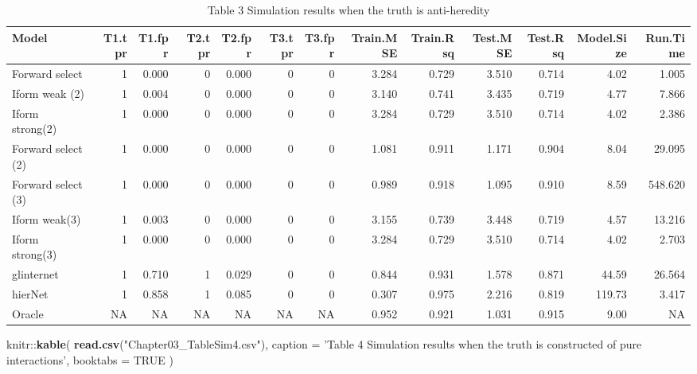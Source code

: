 \documentclass[11pt,]{book}
\newenvironment{Shaded}{\begin{snugshade}}{\end{snugshade}}
\newcommand{\KeywordTok}[1]{\textcolor[rgb]{0.13,0.29,0.53}{\textbf{{#1}}}}
\newcommand{\DataTypeTok}[1]{\textcolor[rgb]{0.13,0.29,0.53}{{#1}}}
\newcommand{\StringTok}[1]{\textcolor[rgb]{0.31,0.60,0.02}{{#1}}}
\newcommand{\OtherTok}[1]{\textcolor[rgb]{0.56,0.35,0.01}{{#1}}}
\newcommand{\NormalTok}[1]{{#1}}
\theoremstyle{definition}
\theoremstyle{definition}
\theoremstyle{remark}
\begin{document}
\begin{table}

\caption{\label{tab:Chap3sim3}Table 3 Simulation results when the truth is anti-heredity}
\centering
\begin{tabular}[t]{lrrrrrrrrrrrr}
\toprule
Model & T1.tpr & T1.fpr & T2.tpr & T2.fpr & T3.tpr & T3.fpr & Train.MSE & Train.Rsq & Test.MSE & Test.Rsq & Model.Size & Run.Time\\
\midrule
Forward select & 1 & 0.000 & 0 & 0.000 & 0 & 0 & 3.284 & 0.729 & 3.510 & 0.714 & 4.02 & 1.005\\
Iform weak (2) & 1 & 0.004 & 0 & 0.000 & 0 & 0 & 3.140 & 0.741 & 3.435 & 0.719 & 4.77 & 7.866\\
Iform strong(2) & 1 & 0.000 & 0 & 0.000 & 0 & 0 & 3.284 & 0.729 & 3.510 & 0.714 & 4.02 & 2.386\\
Forward select (2) & 1 & 0.000 & 0 & 0.000 & 0 & 0 & 1.081 & 0.911 & 1.171 & 0.904 & 8.04 & 29.095\\
Forward select (3) & 1 & 0.000 & 0 & 0.000 & 0 & 0 & 0.989 & 0.918 & 1.095 & 0.910 & 8.59 & 548.620\\
\addlinespace
Iform weak(3) & 1 & 0.003 & 0 & 0.000 & 0 & 0 & 3.155 & 0.739 & 3.448 & 0.719 & 4.57 & 13.216\\
Iform strong(3) & 1 & 0.000 & 0 & 0.000 & 0 & 0 & 3.284 & 0.729 & 3.510 & 0.714 & 4.02 & 2.703\\
glinternet & 1 & 0.710 & 1 & 0.029 & 0 & 0 & 0.844 & 0.931 & 1.578 & 0.871 & 44.59 & 26.564\\
hierNet & 1 & 0.858 & 1 & 0.085 & 0 & 0 & 0.307 & 0.975 & 2.216 & 0.819 & 119.73 & 3.417\\
Oracle & NA & NA & NA & NA & NA & NA & 0.952 & 0.921 & 1.031 & 0.915 & 9.00 & NA\\
\bottomrule
\end{tabular}
\end{table}

\begin{Shaded}
\begin{Highlighting}[]
\NormalTok{knitr::}\KeywordTok{kable}\NormalTok{(}
  \KeywordTok{read.csv}\NormalTok{(}\StringTok{"Chapter03_TableSim4.csv"}\NormalTok{), }\DataTypeTok{caption =} \StringTok{'Table 4 Simulation results when the truth is constructed of pure interactions'}\NormalTok{,}
  \DataTypeTok{booktabs =} \OtherTok{TRUE}
\NormalTok{)}
\end{Highlighting}
\end{Shaded}
\end{document}
